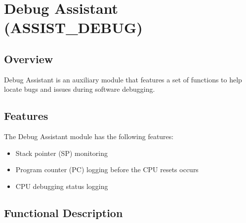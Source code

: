 \documentclass[main\_\_EN.tex]{subfiles}
\begin{document}

\ifglobal
\else
    {\let\clearpage\relax \listoftodos}
    {\let\clearpage\relax \listofdonetodos}
    \tableofcontents
\fi





\hypertarget{dbgassist}{}
\chapter{Debug Assistant (ASSIST\_DEBUG)}
\label{mod:dbgassist}



\section{Overview}

Debug Assistant is an auxiliary module that features a set of functions to help locate bugs and issues during software debugging.



\section{Features}
\label{sec:dbgassist-features}

The Debug Assistant module has the following features:

\begin{itemize}
    \item Stack pointer (SP) monitoring
    \item Program counter (PC) logging before the CPU resets occurs
    \item CPU debugging status logging
\end{itemize}



\section{Functional Description}\label{sec:dbgassist-func-descr}
\end{document}
